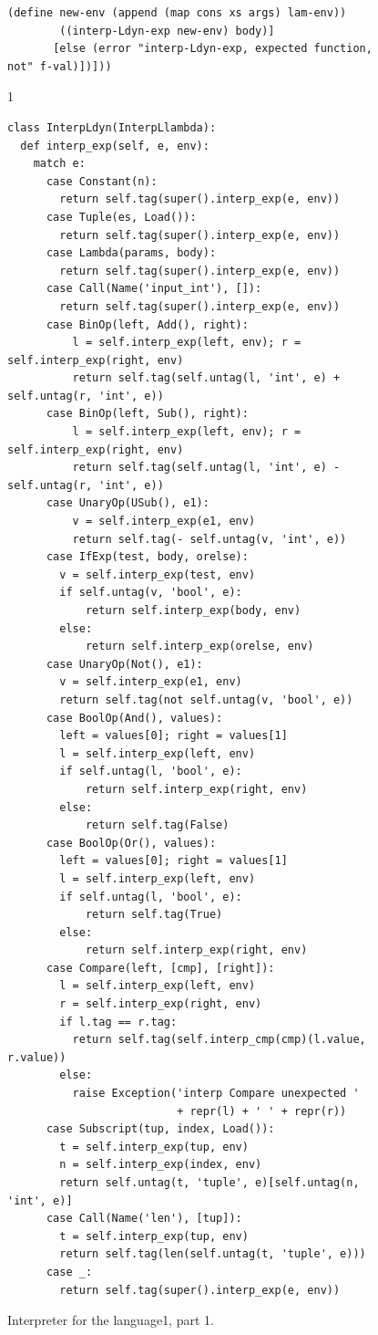 \documentclass[7x10]{TimesAPriori_MIT}%
\def\pythonEd{1}
\def\edition{1}
\newcommand{\pythonColor}[0]{}
\newcommand{\python}[1]{{\if\edition\pythonEd\pythonColor #1\fi}}
\numberwithin{theorem}{chapter}
\numberwithin{definition}{chapter}
\numberwithin{equation}{chapter}
\begin{document}
\begin{figure}[tbp]
\begin{tcolorbox}[colback=white]
{\begin{lstlisting}[basicstyle=\ttfamily\footnotesize]
        (define new-env (append (map cons xs args) lam-env))
        ((interp-Ldyn-exp new-env) body)]
       [else (error "interp-Ldyn-exp, expected function, not" f-val)])]))
\end{lstlisting}
\fi}
{\if\edition\pythonEd\pythonColor
\begin{lstlisting}[basicstyle=\ttfamily\scriptsize]
class InterpLdyn(InterpLlambda):
  def interp_exp(self, e, env):
    match e:
      case Constant(n):
        return self.tag(super().interp_exp(e, env))
      case Tuple(es, Load()):
        return self.tag(super().interp_exp(e, env))
      case Lambda(params, body):
        return self.tag(super().interp_exp(e, env))
      case Call(Name('input_int'), []):
        return self.tag(super().interp_exp(e, env))
      case BinOp(left, Add(), right):
          l = self.interp_exp(left, env); r = self.interp_exp(right, env)
          return self.tag(self.untag(l, 'int', e) + self.untag(r, 'int', e))
      case BinOp(left, Sub(), right):
          l = self.interp_exp(left, env); r = self.interp_exp(right, env)
          return self.tag(self.untag(l, 'int', e) - self.untag(r, 'int', e))
      case UnaryOp(USub(), e1):
          v = self.interp_exp(e1, env)
          return self.tag(- self.untag(v, 'int', e))
      case IfExp(test, body, orelse):
        v = self.interp_exp(test, env)
        if self.untag(v, 'bool', e):
            return self.interp_exp(body, env)
        else:
            return self.interp_exp(orelse, env)
      case UnaryOp(Not(), e1):
        v = self.interp_exp(e1, env)
        return self.tag(not self.untag(v, 'bool', e))
      case BoolOp(And(), values):
        left = values[0]; right = values[1]
        l = self.interp_exp(left, env)
        if self.untag(l, 'bool', e):
            return self.interp_exp(right, env)
        else:
            return self.tag(False)
      case BoolOp(Or(), values):
        left = values[0]; right = values[1]
        l = self.interp_exp(left, env)
        if self.untag(l, 'bool', e):
            return self.tag(True)
        else:
            return self.interp_exp(right, env)
      case Compare(left, [cmp], [right]):
        l = self.interp_exp(left, env)
        r = self.interp_exp(right, env)
        if l.tag == r.tag:
          return self.tag(self.interp_cmp(cmp)(l.value, r.value))
        else:
          raise Exception('interp Compare unexpected '
                          + repr(l) + ' ' + repr(r))
      case Subscript(tup, index, Load()):
        t = self.interp_exp(tup, env)
        n = self.interp_exp(index, env)
        return self.untag(t, 'tuple', e)[self.untag(n, 'int', e)]
      case Call(Name('len'), [tup]):
        t = self.interp_exp(tup, env)
        return self.tag(len(self.untag(t, 'tuple', e)))
      case _:
        return self.tag(super().interp_exp(e, env))
\end{lstlisting}
\fi}
  \end{tcolorbox}

  \caption{Interpreter for the \LangDyn{} language\python{, part 1}.}
\label{fig:interp-Ldyn}
\end{figure}
\end{document}
